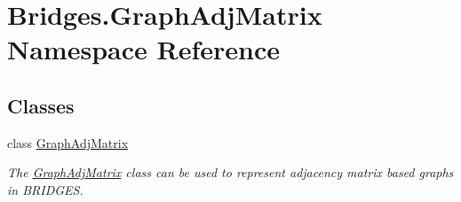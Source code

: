\hypertarget{namespace_bridges_1_1_graph_adj_matrix}{}\section{Bridges.\+Graph\+Adj\+Matrix Namespace Reference}
\label{namespace_bridges_1_1_graph_adj_matrix}
\subsection*{Classes}
\begin{DoxyCompactItemize}
\item 
class \mbox{\hyperlink{class_bridges_1_1_graph_adj_matrix_1_1_graph_adj_matrix}{Graph\+Adj\+Matrix}}
\begin{DoxyCompactList}\small\item\em The \mbox{\hyperlink{class_bridges_1_1_graph_adj_matrix_1_1_graph_adj_matrix}{Graph\+Adj\+Matrix}} class can be used to represent adjacency matrix based graphs in B\+R\+I\+D\+G\+ES. \end{DoxyCompactList}\end{DoxyCompactItemize}
